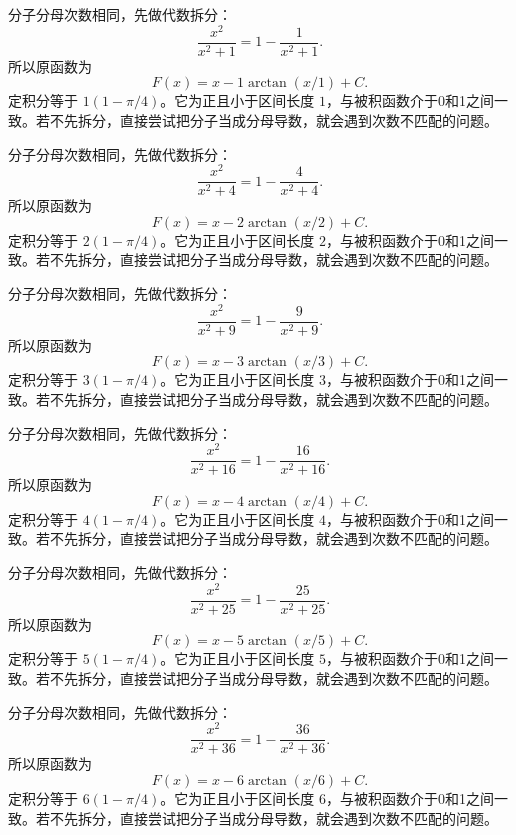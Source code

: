 \documentclass[UTF8,12pt,a4paper,fontset=fandol]{ctexart}
\begin{document}
\begin{solve}\label{ans:c15q19}
分子分母次数相同，先做代数拆分：
\[
\frac{x^2}{x^2+1}=1-\frac{1}{x^2+1}.
\]
所以原函数为
\[
F(x)=x-1\arctan(x/1)+C.
\]
定积分等于 $1(1-\pi/4)$。它为正且小于区间长度 $1$，与被积函数介于0和1之间一致。若不先拆分，直接尝试把分子当成分母导数，就会遇到次数不匹配的问题。
\end{solve}

\begin{solve}\label{ans:c15q20}
分子分母次数相同，先做代数拆分：
\[
\frac{x^2}{x^2+4}=1-\frac{4}{x^2+4}.
\]
所以原函数为
\[
F(x)=x-2\arctan(x/2)+C.
\]
定积分等于 $2(1-\pi/4)$。它为正且小于区间长度 $2$，与被积函数介于0和1之间一致。若不先拆分，直接尝试把分子当成分母导数，就会遇到次数不匹配的问题。
\end{solve}

\begin{solve}\label{ans:c15q21}
分子分母次数相同，先做代数拆分：
\[
\frac{x^2}{x^2+9}=1-\frac{9}{x^2+9}.
\]
所以原函数为
\[
F(x)=x-3\arctan(x/3)+C.
\]
定积分等于 $3(1-\pi/4)$。它为正且小于区间长度 $3$，与被积函数介于0和1之间一致。若不先拆分，直接尝试把分子当成分母导数，就会遇到次数不匹配的问题。
\end{solve}

\begin{solve}\label{ans:c15q22}
分子分母次数相同，先做代数拆分：
\[
\frac{x^2}{x^2+16}=1-\frac{16}{x^2+16}.
\]
所以原函数为
\[
F(x)=x-4\arctan(x/4)+C.
\]
定积分等于 $4(1-\pi/4)$。它为正且小于区间长度 $4$，与被积函数介于0和1之间一致。若不先拆分，直接尝试把分子当成分母导数，就会遇到次数不匹配的问题。
\end{solve}

\begin{solve}\label{ans:c15q23}
分子分母次数相同，先做代数拆分：
\[
\frac{x^2}{x^2+25}=1-\frac{25}{x^2+25}.
\]
所以原函数为
\[
F(x)=x-5\arctan(x/5)+C.
\]
定积分等于 $5(1-\pi/4)$。它为正且小于区间长度 $5$，与被积函数介于0和1之间一致。若不先拆分，直接尝试把分子当成分母导数，就会遇到次数不匹配的问题。
\end{solve}

\begin{solve}\label{ans:c15q24}
分子分母次数相同，先做代数拆分：
\[
\frac{x^2}{x^2+36}=1-\frac{36}{x^2+36}.
\]
所以原函数为
\[
F(x)=x-6\arctan(x/6)+C.
\]
定积分等于 $6(1-\pi/4)$。它为正且小于区间长度 $6$，与被积函数介于0和1之间一致。若不先拆分，直接尝试把分子当成分母导数，就会遇到次数不匹配的问题。
\end{solve}
\end{document}
